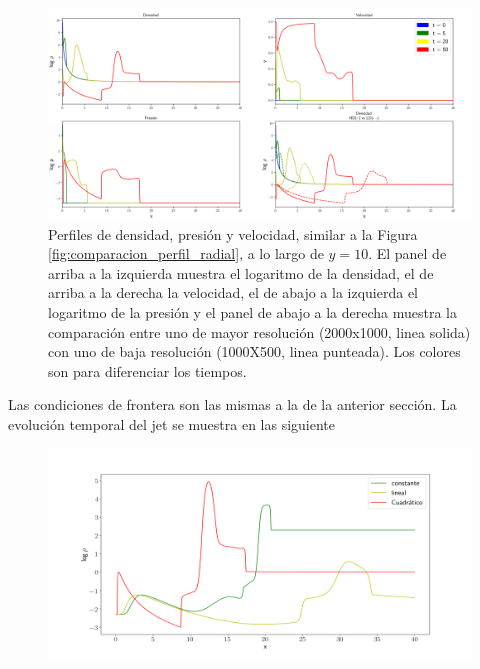 \documentclass[12pt,a4paper]{book}
\begin{document}
{\begin{figure}
  \centering
  \includegraphics[width = 1.0\textwidth]{./Figuras/jet/perfiles/perfiles_cuadraticos.png}
  \caption{{\color{red} Perfiles de densidad, presión y velocidad, similar a la Figura \ref{fig:comparacion_perfil_radial},
  a lo largo de $y = 10$. El panel de arriba a la izquierda muestra el logaritmo de la densidad, el de arriba a la derecha la
  velocidad, el de abajo a la izquierda el logaritmo de la presión y el panel de abajo a la derecha muestra la comparación entre
  uno de mayor resolución (2000x1000, linea solida) con uno de baja resolución (1000X500,
  linea punteada). Los colores son para diferenciar los tiempos.}}\label{fig:Decaimiento_cuadratico_densidad_jet}
\end{figure}



Las condiciones de frontera son las mismas a la de la anterior sección. 
La evolución temporal del jet se muestra en las siguiente 



\begin{figure}
  \centering
    \includegraphics[width=1\textwidth]{./Figuras/jet/perfiles/densidades_comparacion.png}
  \caption{}\label{fig:perfiles_comparacion_jet}
\end{figure}

}
\end{document}
